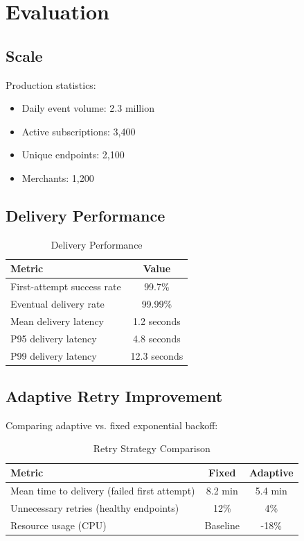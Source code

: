 \section{Evaluation}


\subsection{Scale}

Production statistics:

\begin{itemize}
    \item Daily event volume: 2.3 million
    \item Active subscriptions: 3,400
    \item Unique endpoints: 2,100
    \item Merchants: 1,200
\end{itemize}

\subsection{Delivery Performance}

\begin{table}[h]
\centering
\caption{Delivery Performance}
\begin{tabular}{lc}
\toprule
\textbf{Metric} & \textbf{Value} \\
\midrule
First-attempt success rate & 99.7\% \\
Eventual delivery rate & 99.99\% \\
Mean delivery latency & 1.2 seconds \\
P95 delivery latency & 4.8 seconds \\
P99 delivery latency & 12.3 seconds \\
\bottomrule
\end{tabular}
\end{table}

\subsection{Adaptive Retry Improvement}

Comparing adaptive vs. fixed exponential backoff:

\begin{table}[h]
\centering
\caption{Retry Strategy Comparison}
\begin{tabular}{lcc}
\toprule
\textbf{Metric} & \textbf{Fixed} & \textbf{Adaptive} \\
\midrule
Mean time to delivery (failed first attempt) & 8.2 min & 5.4 min \\
Unnecessary retries (healthy endpoints) & 12\% & 4\% \\
Resource usage (CPU) & Baseline & -18\% \\
\bottomrule
\end{tabular}
\end{table}

